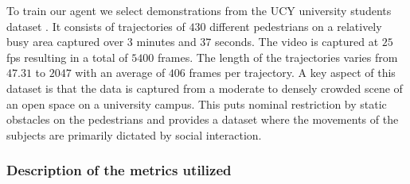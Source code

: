To train our agent we select demonstrations from the UCY university students dataset \cite{lerner_crowds_by_example_2007}. It consists of trajectories of $430$ different pedestrians on a relatively busy area captured over $3$ minutes and $37$ seconds. The video is captured at $25$ fps resulting in a total of $5400$ frames. The length of the trajectories varies from $47.31$  to $2047$ with an average of $406$ frames per trajectory. A key aspect of this dataset is that the data is captured from a moderate to densely crowded scene of an open space on a university campus. This puts nominal restriction by static obstacles on the pedestrians and provides a dataset where the movements of the subjects are primarily dictated by social interaction.

%            

\subsubsection*{Description of the metrics utilized}
%

